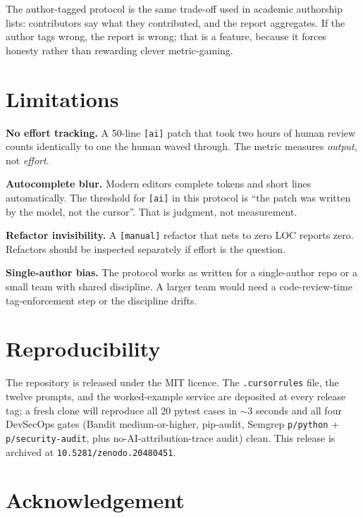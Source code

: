 \documentclass[conference]{IEEEtran}
\begin{document}
The author-tagged protocol is the same trade-off used in academic
authorship lists: contributors say what they contributed, and the
report aggregates. If the author tags wrong, the report is wrong;
that is a feature, because it forces honesty rather than rewarding
clever metric-gaming.

\section{Limitations}
\label{sec:limits}

\textbf{No effort tracking.} A 50-line \texttt{[ai]} patch that took
two hours of human review counts identically to one the human waved
through. The metric measures \emph{output}, not \emph{effort}.

\textbf{Autocomplete blur.} Modern editors complete tokens and short
lines automatically. The threshold for \texttt{[ai]} in this protocol
is ``the patch was written by the model, not the cursor''. That is
judgment, not measurement.

\textbf{Refactor invisibility.} A \texttt{[manual]} refactor that
nets to zero LOC reports zero. Refactors should be inspected
separately if effort is the question.

\textbf{Single-author bias.} The protocol works as written for a
single-author repo or a small team with shared discipline. A larger
team would need a code-review-time tag-enforcement step or the
discipline drifts.

\section{Reproducibility}
\label{sec:repro}

The repository is released under the MIT licence. The
\texttt{.cursorrules} file, the twelve prompts, and the worked-example
service are deposited at every release tag; a fresh clone will
reproduce all 20 pytest cases in $\sim$3 seconds and all four
DevSecOps gates (Bandit medium-or-higher, pip-audit, Semgrep
\texttt{p/python} + \texttt{p/security-audit}, plus
no-AI-attribution-trace audit) clean. This release is archived at
\texttt{10.5281/zenodo.20480451}.

\section*{Acknowledgement}
\end{document}

